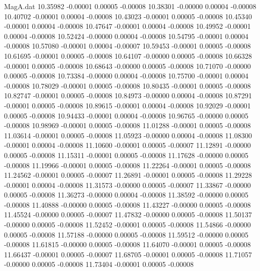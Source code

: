 \begin{filecontents}{MagA.dat}
  10.35982   -0.00001    0.00005   -0.00008
  10.38301   -0.00000    0.00004   -0.00008
  10.40702   -0.00001    0.00004   -0.00008
  10.43023   -0.00001    0.00005   -0.00008
  10.45340   -0.00001    0.00004   -0.00008
  10.47647   -0.00001    0.00004   -0.00008
  10.49952   -0.00001    0.00004   -0.00008
  10.52424   -0.00000    0.00004   -0.00008
  10.54795   -0.00001    0.00004   -0.00008
  10.57080   -0.00001    0.00004   -0.00007
  10.59453   -0.00001    0.00005   -0.00008
  10.61695   -0.00001    0.00005   -0.00008
  10.64107   -0.00000    0.00005   -0.00008
  10.66328   -0.00001    0.00005   -0.00008
  10.68643   -0.00000    0.00005   -0.00008
  10.71070   -0.00000    0.00005   -0.00008
  10.73384   -0.00000    0.00004   -0.00008
  10.75700   -0.00001    0.00004   -0.00008
  10.78029   -0.00001    0.00005   -0.00008
  10.80435   -0.00001    0.00005   -0.00008
  10.82747   -0.00001    0.00005   -0.00008
  10.84973   -0.00000    0.00004   -0.00008
  10.87291   -0.00001    0.00005   -0.00008
  10.89615   -0.00001    0.00004   -0.00008
  10.92029   -0.00001    0.00005   -0.00008
  10.94433   -0.00001    0.00004   -0.00008
  10.96765   -0.00000    0.00005   -0.00008
  10.98969   -0.00001    0.00005   -0.00008
  11.01288   -0.00001    0.00005   -0.00008
  11.03614   -0.00001    0.00005   -0.00008
  11.05923   -0.00000    0.00004   -0.00008
  11.08300   -0.00001    0.00004   -0.00008
  11.10600   -0.00001    0.00005   -0.00007
  11.12891   -0.00000    0.00005   -0.00008
  11.15311   -0.00001    0.00005   -0.00008
  11.17628   -0.00000    0.00005   -0.00008
  11.19966   -0.00001    0.00005   -0.00008
  11.22264   -0.00001    0.00005   -0.00008
  11.24562   -0.00001    0.00005   -0.00007
  11.26891   -0.00001    0.00005   -0.00008
  11.29228   -0.00001    0.00004   -0.00008
  11.31573   -0.00000    0.00005   -0.00007
  11.33867   -0.00000    0.00005   -0.00008
  11.36273   -0.00000    0.00004   -0.00008
  11.38592   -0.00000    0.00005   -0.00008
  11.40888   -0.00000    0.00005   -0.00008
  11.43227   -0.00000    0.00005   -0.00008
  11.45524   -0.00000    0.00005   -0.00007
  11.47832   -0.00000    0.00005   -0.00008
  11.50137   -0.00000    0.00005   -0.00008
  11.52452   -0.00001    0.00005   -0.00008
  11.54866   -0.00000    0.00005   -0.00008
  11.57188   -0.00000    0.00005   -0.00008
  11.59512   -0.00000    0.00005   -0.00008
  11.61815   -0.00000    0.00005   -0.00008
  11.64070   -0.00001    0.00005   -0.00008
  11.66437   -0.00001    0.00005   -0.00007
  11.68705   -0.00001    0.00005   -0.00008
  11.71057   -0.00000    0.00005   -0.00008
  11.73404   -0.00001    0.00005   -0.00008

\end{filecontents}
